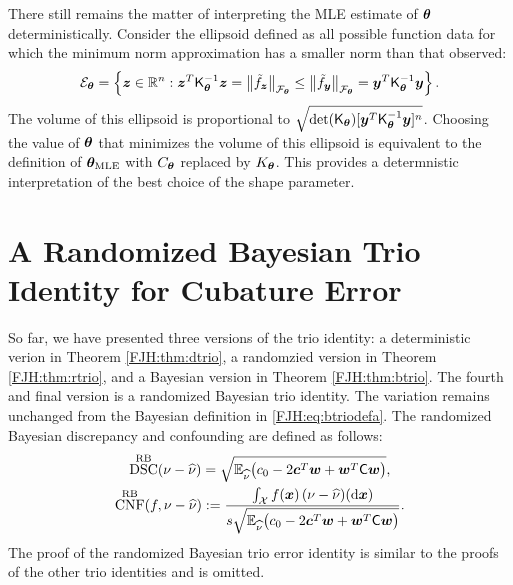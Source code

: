 \documentclass[graybox,footinfo]{svmult}
\DeclareMathOperator{\algn}{CNF}
\DeclareMathOperator{\disc}{DSC}
\begin{document}
There still remains the matter of interpreting the MLE estimate of ${\boldsymbol{\theta}}$ 
deterministically.  Consider the ellipsoid defined as all possible function data for 
which the minimum norm approximation has a smaller norm than that observed:
\[
{\mathcal{E}}_{\boldsymbol{\theta}} = \left\{ {\boldsymbol{z}} \in {\mathbb{R}}^n :  {\boldsymbol{z}}^T 
\mathsf{K}_{\boldsymbol{\theta}}^{-1} {\boldsymbol{z}} = \left \lVert \tilde{f}_{\boldsymbol{z}} \right \rVert_{{\mathcal{F}}_{\boldsymbol{\theta}}} \le 
\left \lVert \tilde{f}_{\boldsymbol{y}} \right \rVert_{{\mathcal{F}}_{\boldsymbol{\theta}}} =  {\boldsymbol{y}}^T 
\mathsf{K}_{\boldsymbol{\theta}}^{-1} {\boldsymbol{y}} \right\}.
\]
The volume of this ellipsoid is proportional to $\sqrt{\det(\mathsf{K}_{\boldsymbol{\theta}}) [ {\boldsymbol{y}}^T 
	\mathsf{K}_{\boldsymbol{\theta}}^{-1} {\boldsymbol{y}}]^n}$.  Choosing the value of ${\boldsymbol{\theta}}$ that minimizes 
	the volume of this ellipsoid is equivalent to the definition of ${\boldsymbol{\theta}}_{\text{MLE}}$ with 
	$C_{\boldsymbol{\theta}}$ replaced by $K_{\boldsymbol{\theta}}$.  This provides a determnistic interpretation of 
	the best choice of the shape parameter.
	
\begin{FJHLesson}
	\FJHLessonNine
\end{FJHLesson}

\section{A Randomized Bayesian Trio Identity for Cubature Error}

So far, we have presented three versions of the trio identity: a deterministic verion  in 
Theorem \ref{FJH:thm:dtrio}, a randomzied version in Theorem \ref{FJH:thm:rtrio}, and a 
Bayesian 
version in Theorem \ref{FJH:thm:btrio}.  The fourth and final version is a randomized 
Bayesian trio identity.  The variation remains unchanged from the Bayesian definition in 
\eqref{FJH:eq:btriodefa}.  
The randomized Bayesian discrepancy and confounding are defined as follows:
\begin{subequations} \label{FJH:eq:rbtriodef}
	\begin{gather}
	\label{FJH:eq:bbtriodefa}
\disc^{\Rn\Ba}(\nu - \hnu) = \sqrt{\bbE_{\hnu}  \bigl(c_0 - 
		2 \bsc^T \bsw + \bsw ^T \mC \bsw \bigr)},\\
	\algn^{\Rn\Ba}(f,\nu - \hnu) :=\frac{ \int_{\calX} 
		f(\bsx) \, (\nu - \hnu)(\D\bsx)}{s  \sqrt{\bbE_{\hnu}  \bigl(c_0 - 
			2 \bsc^T \bsw + \bsw ^T \mC \bsw \bigr)}}.
	\end{gather}
\end{subequations}
The proof of the randomized Bayesian trio error identity is similar to the proofs of the 
other trio identities and is omitted.
\end{document}
